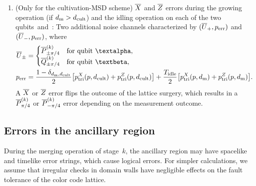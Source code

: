 \documentclass[
 prx,
 reprint,
 superscriptaddress,
 longbibliography,
 dvipsnames
]{revtex4-2}
\begin{document}
\begin{widetext}
\begin{enumerate}
    \item (Only for the cultivation-MSD scheme) $\overline{X}$ and $\overline{Z}$ errors during the growing operation (if $d_{\mathrm{m}} > d_\mathrm{cult}$) and the idling operation on each of the two qubits~\talpha and~\tbeta: Two additional noise channels characterized by $(\overline{U}_+, p_{\mathrm{err}})$ and $(\overline{U}_-, p_{\mathrm{err}})$, where
    \begin{align*}
        \lgc{U}_\pm &= \begin{cases}
            \rot{\Pstage{k}}{\pm\pi/4} & \text{for qubit~\talpha},\\
            \rot{\Qstage{k}}{\pm\pi/4} & \text{for qubit~\tbeta},\\
        \end{cases} \\
        p_\mr{err} &= \frac{1 - \delta_{\dm, \dcult}}{2} \qty[\plogtri{X}(p, \dcult) + \plogtri{Z}(p, \dcult)] + \frac{T_\mr{idle}}{2} \qty[\plogtri{X}(p, \dm) + \plogtri{Z}(p, \dm)].
    \end{align*}
    A $\overline{X}$ or $\overline{Z}$ error flips the outcome of the lattice surgery, which results in a $\overline{P}^{(k)}_{\pi/4}$ or $\overline{P}^{(k)}_{-\pi/4}$ error depending on the measurement outcome.
\end{enumerate}

\subsection{Errors in the ancillary region \label{subsec:errors_ancillary_region}}

During the merging operation of stage~$k$, the ancillary region may have spacelike and timelike error strings, which cause logical errors.
For simpler calculations, we assume that irregular checks in domain walls have negligible effects on the fault tolerance of the color code lattice.


\end{widetext}
\end{document}
